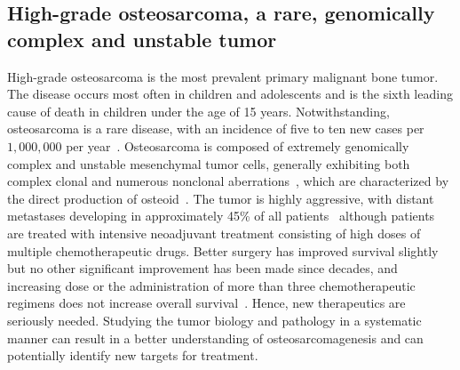 \subsection{High-grade osteosarcoma, a rare, genomically complex and unstable tumor}
High-grade osteosarcoma is the most prevalent primary malignant
bone tumor. The disease occurs most often in children
and adolescents and is the sixth leading cause of death
in children under the age of 15 years. Notwithstanding,
osteosarcoma is a rare disease, with an incidence of five to
ten new cases per $1,000,000$ per year~\cite{fletcher1994cytogenetic,raymond2002conventional}. Osteosarcoma is
composed of extremely genomically complex and unstable
mesenchymal tumor cells, generally exhibiting both complex
clonal and numerous nonclonal aberrations~\cite{fletcher1994cytogenetic}, which are characterized
by the direct production of osteoid~\cite{raymond2002conventional,helman2003mechanisms}. The tumor is
highly aggressive, with distant metastases developing in
approximately 45\% of all patients~\cite{pakos2009prognostic} although patients are
treated with intensive neoadjuvant treatment consisting of
high doses of multiple chemotherapeutic drugs. Better surgery
has improved survival slightly but no other significant
improvement has been made since decades, and increasing
dose or the administration of more than three chemotherapeutic
regimens does not increase overall
survival~\cite{lewis2007improvement,eselgrim2006dose,anninga2011chemotherapeutic}. Hence, new
therapeutics are seriously needed. Studying the tumor
biology and pathology in a systematic manner can result in a
better understanding of osteosarcomagenesis and can potentially
identify new targets for treatment.

